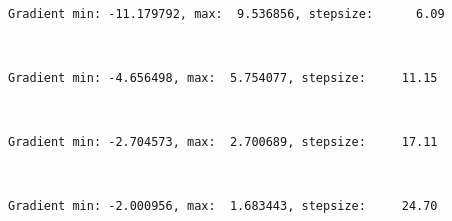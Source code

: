 \documentclass[11pt]{article}
\begin{document}
    \begin{center}
    \end{center}
    { \hspace*{\fill} \\}
    
    \begin{Verbatim}[commandchars=\\\{\}]
Gradient min: -11.179792, max:  9.536856, stepsize:      6.09

    \end{Verbatim}

    \begin{center}
    \end{center}
    { \hspace*{\fill} \\}
    
    \begin{Verbatim}[commandchars=\\\{\}]
Gradient min: -4.656498, max:  5.754077, stepsize:     11.15

    \end{Verbatim}

    \begin{center}
    \end{center}
    { \hspace*{\fill} \\}
    
    \begin{Verbatim}[commandchars=\\\{\}]
Gradient min: -2.704573, max:  2.700689, stepsize:     17.11

    \end{Verbatim}

    \begin{center}
    \end{center}
    { \hspace*{\fill} \\}
    
    \begin{Verbatim}[commandchars=\\\{\}]
Gradient min: -2.000956, max:  1.683443, stepsize:     24.70

    \end{Verbatim}
\end{document}
